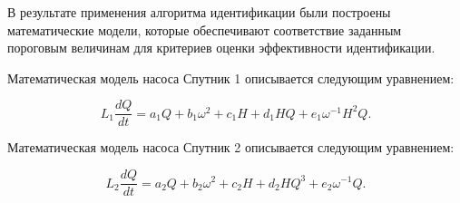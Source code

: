 % 


В результате применения алгоритма идентификации были построены математические модели, которые обеспечивают соответствие заданным пороговым величинам для критериев оценки эффективности идентификации. 

Математическая модель насоса Спутник 1 описывается следующим уравнением:

\begin{equation}
	\label{eq:sputnik_1_eq}
	L_1\frac{dQ}{dt} = a_1Q + b_1\omega^2 + c_1H + d_1HQ + e_1\omega^{-1} H^2 Q.
\end{equation}

Математическая модель насоса Спутник 2 описывается следующим уравнением:

\begin{equation}
	\label{eq:sputnik_2_eq}
	L_2\frac{dQ}{dt} = a_2Q + b_2\omega^2 + c_2H + d_2HQ^3 + e_2\omega^{-1}Q.
\end{equation}



